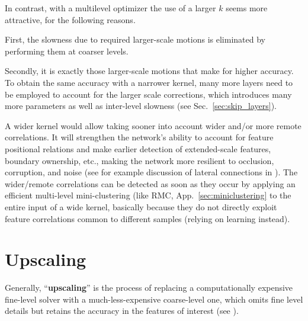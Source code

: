 \documentclass{article} %
\begin{document}
In contrast, with a multilevel optimizer the use of a larger $k$ seems more attractive, for the following reasons.

First, the slowness due to required larger-scale motions is eliminated by performing them at coarser levels.

Secondly, it is exactly those larger-scale motions that make for higher accuracy. To obtain the same accuracy with a narrower kernel, many more layers need to be employed to account for the larger scale corrections, which introduces many more parameters as well as inter-level slowness (see Sec.~\ref{sec:skip_layers}).

A wider kernel would allow taking sooner into account wider and/or more remote correlations. It will strengthen the network's ability to account for feature positional relations and make earlier detection of extended-scale features, boundary ownership, etc., making the network more resilient to occlusion, corruption, and noise (see for example discussion of lateral connections in \cite{montobbio2019kercnns, spoerer}). The wider/remote correlations can be detected as soon as they occur by applying an efficient multi-level mini-clustering (like RMC, App.~\ref{sec:miniclustering} to the entire input of a wide kernel, basically because they do not directly exploit feature correlations common to different samples (relying on learning instead).


\section{Upscaling}
\label{sec:upscaling}
Generally, ``\textbf{upscaling}'' is the process of replacing a computationally expensive fine-level solver with a much-less-expensive coarse-level one, which omits fine level details but retains the accuracy in the features of interest (see \cite{systematic_upscaling}).
\end{document}

